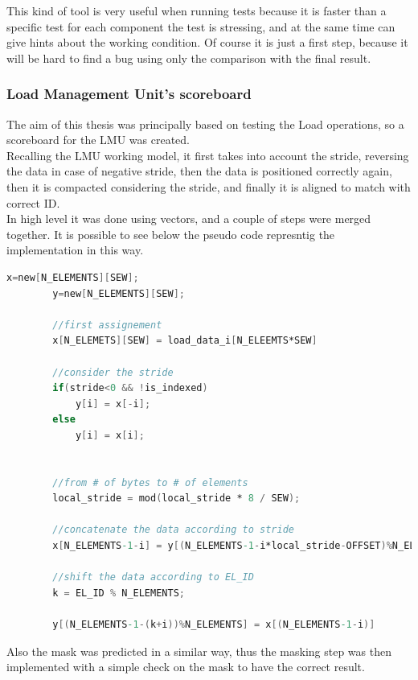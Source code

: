 This kind of tool is very useful when running tests because it is faster than a specific test for each component the test is stressing, and at the same time can give hints about the working condition. Of course it is just a first step, because it will be hard to find a bug using only the comparison with the final result.\\

\subsubsection{Load Management Unit's scoreboard}
The aim of this thesis was principally based on testing the Load operations, so a scoreboard for the LMU was created.\\

Recalling the LMU working model, it first takes into account the stride, reversing the data in case of negative stride, then the data is positioned correctly again, then it is compacted considering the stride, and finally it is aligned to match with correct ID.\\

In high level it was done using vectors, and a couple of steps were merged together. It is possible to see below the pseudo code represntig the implementation in this way.

\linespread{1}
\begin{lstlisting}[language=Verilog,style=verilog-style, backgroundcolor=\color{lyel_palette}, frame=tlb]
        x=new[N_ELEMENTS][SEW];
        y=new[N_ELEMENTS][SEW];

        //first assignement
        x[N_ELEMETS][SEW] = load_data_i[N_ELEEMTS*SEW]

        //consider the stride
        if(stride<0 && !is_indexed)
            y[i] = x[-i];
        else
            y[i] = x[i];
        

        //from # of bytes to # of elements
        local_stride = mod(local_stride * 8 / SEW);

        //concatenate the data according to stride 
        x[N_ELEMENTS-1-i] = y[(N_ELEMENTS-1-i*local_stride-OFFSET)%N_ELEMENTS];

        //shift the data according to EL_ID
        k = EL_ID % N_ELEMENTS;
        
        y[(N_ELEMENTS-1-(k+i))%N_ELEMENTS] = x[(N_ELEMENTS-1-i)]
\end{lstlisting}
\linespread{1.2}

Also the mask was predicted in a similar way, thus the masking step was then implemented with a simple check on the mask to have the correct result.\\

